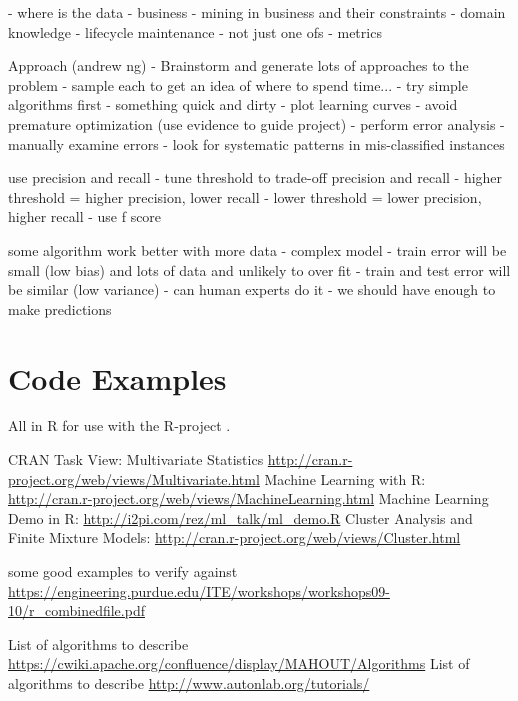 \begin{bibunit}
- where is the data - business
- mining in business and their constraints
- domain knowledge
- lifecycle maintenance - not just one ofs
- metrics

Approach (andrew ng)
- Brainstorm and generate lots of approaches to the problem - sample each to get an idea of where to spend time...
- try simple algorithms first - something quick and dirty
- plot learning curves
	- avoid premature optimization (use evidence to guide project)
- perform error analysis
	- manually examine errors
	- look for systematic patterns in mis-classified instances

use precision and recall
- tune threshold to trade-off precision and recall
	- higher threshold = higher precision, lower recall
	- lower threshold = lower precision, higher recall
- use f score

some algorithm work better with more data
- complex model - train error will be small (low bias) and lots of data and unlikely to over fit - train and test error will be similar (low variance)
- can human experts do it - we should have enough to make predictions


\section{Code Examples}

All in R for use with the R-project \cite{RDevelopmentCoreTeam2011}.

CRAN Task View: Multivariate Statistics \url{http://cran.r-project.org/web/views/Multivariate.html}
Machine Learning with R: \url{http://cran.r-project.org/web/views/MachineLearning.html}
Machine Learning Demo in R: \url{http://i2pi.com/rez/ml_talk/ml_demo.R}
Cluster Analysis and Finite Mixture Models: \url{http://cran.r-project.org/web/views/Cluster.html}

some good examples to verify against \url{https://engineering.purdue.edu/ITE/workshops/workshops09-10/r_combinedfile.pdf}

List of algorithms to describe \url{https://cwiki.apache.org/confluence/display/MAHOUT/Algorithms}
List of algorithms to describe \url{http://www.autonlab.org/tutorials/}

\renewcommand{\bibsection}{\section{\bibname}}
\putbib
\end{bibunit}
